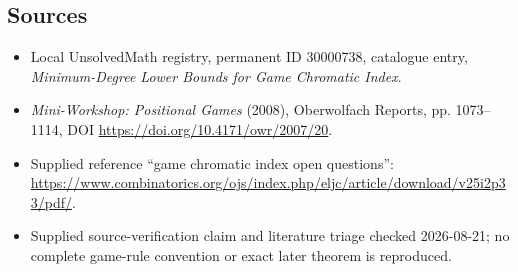 \documentclass[11pt]{article}
\begin{document}
\subsection{Sources}
\begin{itemize}
\item Local UnsolvedMath registry, permanent ID 30000738, catalogue entry, \emph{Minimum-Degree Lower Bounds for Game Chromatic Index}.
\item \emph{Mini-Workshop: Positional Games} (2008), Oberwolfach Reports, pp. 1073--1114, DOI \url{https://doi.org/10.4171/owr/2007/20}.
\item Supplied reference ``game chromatic index open questions'': \url{https://www.combinatorics.org/ojs/index.php/eljc/article/download/v25i2p33/pdf/}.
\item Supplied source-verification claim and literature triage checked 2026-08-21; no complete game-rule convention or exact later theorem is reproduced.
\end{itemize}
\end{document}
